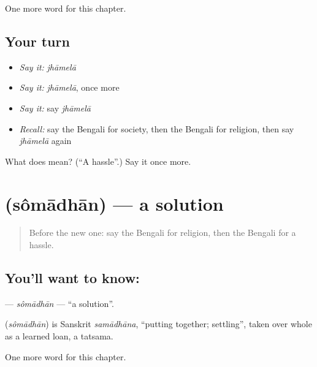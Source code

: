 \begin{grammarlens}[title={What you've built}]
One more word for this chapter.
\end{grammarlens}

\subsection*{Your turn}
\begin{itemize}
\raggedright
  \item \emph{Say it:} \emph{jhāmelā}
  \item \emph{Say it:} \emph{jhāmelā}, once more
  \item \emph{Say it:} say \emph{jhāmelā}
  \item \emph{Recall:} say the Bengali for society, then the Bengali for religion, then say \emph{jhāmelā} again
\end{itemize}

\begin{tcolorbox}[breakable,colback=teal!4,colframe=teal!35!black,title={Before you move on}]
What does  mean? (\textquotedblleft{}A hassle\textquotedblright{}.) Say it once more.
\end{tcolorbox}
\section[\texorpdfstring{\bn{সমাধান} (sômādhān)}{সমাধান (sômādhān)}]{ (sômādhān) — a solution}

\label{lesson:BN-C231-somadhan}



\begin{quote}
Before the new one: say the Bengali for religion, then the Bengali for a hassle.
\end{quote}

\subsection*{You'll want to know: }
\textbf{} — \emph{sômādhān} — \textquotedblleft{}a solution\textquotedblright{}.

\begin{cousinweb}
\textbf{} (\emph{sômādhān}) is Sanskrit \emph{samādhāna}, \textquotedblleft{}putting together; settling\textquotedblright{}, taken over whole as a learned loan, a tatsama.
\end{cousinweb}

\begin{grammarlens}[title={What you've built}]
One more word for this chapter.
\end{grammarlens}

